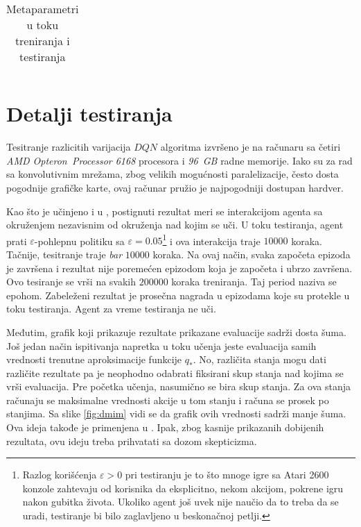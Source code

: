 \begin{table}
{\begin{tabularx}{\textwidth}{|l|c|X|}
\end{tabularx} }
\caption{Metaparametri u toku treniranja i testiranja}
\label{tbl:metaparametri}
\end{table}

\section{Detalji testiranja}
\label{sec:testiranje}
Tesitranje razlicitih varijacija $DQN$ algoritma izvršeno je na računaru sa četiri {\em AMD Opteron\texttrademark ~Processor 6168} procesora i {\em 96~GB} radne memorije. Iako su za rad sa konvolutivnim mrežama, zbog velikih mogućnosti paralelizacije, često dosta pogodnije grafičke karte, ovaj računar pružio je najpogodniji dostupan hardver. 
\par 
Kao što je učinjeno i u \cite{dqn_mnih}, postignuti rezultat meri se interakcijom agenta sa okruženjem nezavisnim od okruženja nad kojim se uči. U toku testiranja, agent prati $\varepsilon$-pohlepnu politiku sa $\varepsilon=0.05$\footnote{Razlog korišćenja $\varepsilon > 0$ pri testiranju je to što mnoge igre sa Atari 2600 konzole zahtevaju od korisnika da eksplicitno, nekom akcijom, pokrene igru nakon gubitka života. Ukoliko agent još uvek nije naučio da to treba da se uradi, testiranje bi bilo zaglavljeno u beskonačnoj petlji.} i ova interakcija traje $10000$ koraka. Tačnije, tesitranje traje {\em bar} $10000$ koraka. Na ovaj način, svaka započeta epizoda je završena i rezultat nije poremećen epizodom koja je započeta i ubrzo završena. Ovo tesiranje se vrši na svakih $200000$ koraka treniranja. Taj period naziva se epohom. Zabeleženi rezultat je prosečna nagrada u epizodama koje su protekle u toku testiranja. Agent za vreme testiranja ne uči.
\par 
Međutim, grafik koji prikazuje rezultate prikazane evaluacije sadrži dosta šuma. Još jedan način ispitivanja napretka u toku učenja jeste evaluacija samih vrednosti trenutne aproksimacije funkcije $q_*$. No, različita stanja mogu dati različite rezultate pa je neophodno odabrati fiksirani skup stanja nad kojima se vrši evaluacija. Pre početka učenja, nasumično se bira skup stanja. Za ova stanja računaju se maksimalne vrednosti akcije u tom stanju i računa se prosek po stanjima. Sa slike \ref{fig:dmim} vidi se da grafik ovih vrednosti sadrži manje šuma. Ova ideja takođe je primenjena u \cite{dqn_mnih}. Ipak, zbog kasnije prikazanih dobijenih rezultata, ovu ideju treba prihvatati sa dozom skepticizma.
